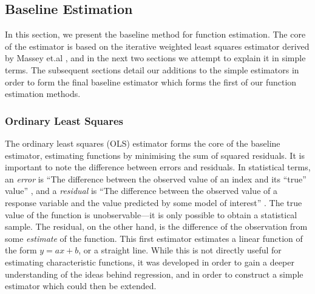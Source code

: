 \documentclass[a4paper,11pt]{article}
\begin{document}
\subsection{Baseline Estimation}
\label{sec-4-1}

   In this section, we present the baseline method for function estimation. The
   core of the estimator is based on the iterative weighted least squares
   estimator derived by Massey et.al \cite{massey1996estimating}, and in the
   next two sections we attempt to explain it in simple terms. The subsequent
   sections detail our additions to the simple estimators in order to form the
   final baseline estimator which forms the first of our function
   estimation methods.
\subsubsection{Ordinary Least Squares}
\label{sec-4-1-1}

    The ordinary least squares (OLS) estimator forms the core of the baseline
    estimator, estimating functions by minimising the sum of squared
    residuals. It is important to note the difference between errors and
    residuals. In statistical terms, an \emph{error} is ``The difference between
    the observed value of an index and its ``true'' value'' \cite{2008oecd}, and
    a \emph{residual} is ``The difference between the observed value of a
    response variable and the value predicted by some model of interest''
    \cite{everitt2010cambridge}. The true value of the function is
    unobservable---it is only possible to obtain a statistical sample. The
    residual, on the other hand, is the difference of the observation from some
    \emph{estimate} of the function. This first estimator estimates a linear
    function of the form $y=ax+b$, or a straight line. While this is not
    directly useful for estimating characteristic functions, it was developed in
    order to gain a deeper understanding of the ideas behind regression, and in
    order to construct a simple estimator which could then be extended.
\end{document}

